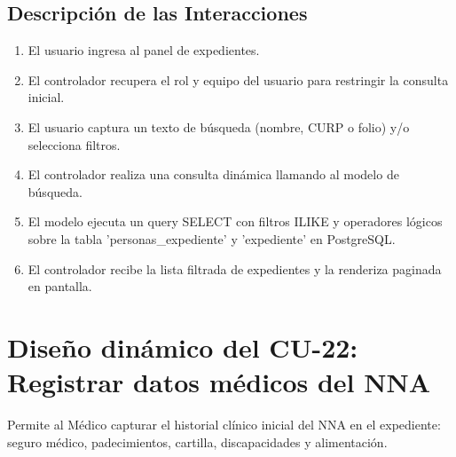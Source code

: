 \subsection{Descripción de las Interacciones}
\begin{enumerate}
    \item El usuario ingresa al panel de expedientes.
    \item El controlador recupera el rol y equipo del usuario para restringir la consulta inicial.
    \item El usuario captura un texto de búsqueda (nombre, CURP o folio) y/o selecciona filtros.
    \item El controlador realiza una consulta dinámica llamando al modelo de búsqueda.
    \item El modelo ejecuta un query SELECT con filtros ILIKE y operadores lógicos sobre la tabla 'personas\_expediente' y 'expediente' en PostgreSQL.
    \item El controlador recibe la lista filtrada de expedientes y la renderiza paginada en pantalla.
\end{enumerate}

\cleardoublepage
\section{Diseño dinámico del CU-22: Registrar datos médicos del NNA}
\label{sec:disenoDinamicoCU22}

Permite al Médico capturar el historial clínico inicial del NNA en el expediente: seguro médico, padecimientos, cartilla, discapacidades y alimentación.

